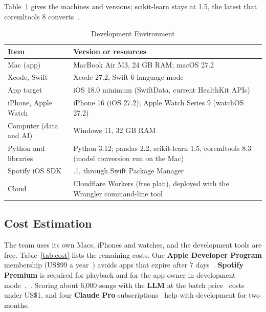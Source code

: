 \documentclass[conference]{IEEEtran}
\begin{document}
Table~\ref{tab:env} gives the machines and versions; scikit-learn stays at 1.5, the latest that coremltools 8 converts~\cite{coremltools}.

\begin{table}[H]
\centering
\caption{Development Environment}
\label{tab:env}
\scriptsize
\begin{tabularx}{\columnwidth}{|>{\raggedright\arraybackslash}p{2.2cm}|>{\raggedright\arraybackslash}X|}
\hline
\textbf{Item} & \textbf{Version or resources} \\ \hline
Mac (app) & MacBook Air M3, 24 GB RAM; macOS 27.2 \\ \hline
Xcode, Swift & Xcode 27.2, Swift 6 language mode \\ \hline
App target & iOS 18.0 minimum (SwiftData, current HealthKit APIs) \\ \hline
iPhone, Apple Watch & iPhone 16 (iOS 27.2); Apple Watch Series 9 (watchOS 27.2) \\ \hline
Computer (data and AI) & Windows 11, 32 GB RAM \\ \hline
Python and libraries & Python 3.12; pandas 2.2, scikit-learn 1.5, coremltools 8.3 (model conversion run on the Mac) \\ \hline
Spotify iOS SDK & 5.0.1, through Swift Package Manager \\ \hline
Cloud & Cloudflare Workers (free plan), deployed with the Wrangler command-line tool \\ \hline
\end{tabularx}
\end{table}

\subsection{Cost Estimation}
The team uses its own Macs, iPhones and watches, and the development tools are free. Table~\ref{tab:cost} lists the remaining costs. One \textbf{Apple Developer Program} membership (US\$99 a year~\cite{appledev}) avoids apps that expire after 7 days~\cite{applemember}. \textbf{Spotify Premium} is required for playback and for the app owner in development mode~\cite{spotify2026},~\cite{spotifykr}. Scoring about 6,000 songs with the \textbf{LLM} at the batch price~\cite{claudeprice} costs under US\$1, and four \textbf{Claude Pro} subscriptions~\cite{claudepro} help with development for two months.
\end{document}
